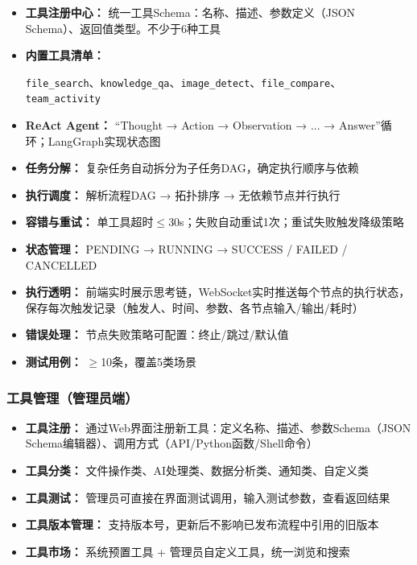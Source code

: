 \documentclass[a4paper,zihao=-4]{ctexart}
\begin{document}
\begin{itemize}
  \item \textbf{工具注册中心：} 统一工具Schema：名称、描述、参数定义（JSON Schema）、返回值类型。不少于6种工具
  \item \textbf{内置工具清单：}

        \texttt{file\_search}、\texttt{knowledge\_qa}、\texttt{image\_detect}、\texttt{file\_compare}、\texttt{team\_activity}
  \item \textbf{ReAct Agent：} “Thought → Action → Observation → ... →
        Answer”循环；LangGraph实现状态图
  \item \textbf{任务分解：} 复杂任务自动拆分为子任务DAG，确定执行顺序与依赖
  \item \textbf{执行调度：} 解析流程DAG → 拓扑排序 → 无依赖节点并行执行
  \item \textbf{容错与重试：} 单工具超时$\leq$30s；失败自动重试1次；重试失败触发降级策略
  \item \textbf{状态管理：} PENDING → RUNNING → SUCCESS / FAILED / CANCELLED
  \item \textbf{执行透明：}
        前端实时展示思考链，WebSocket实时推送每个节点的执行状态，保存每次触发记录（触发人、时间、参数、各节点输入/输出/耗时）
  \item \textbf{错误处理：} 节点失败策略可配置：终止/跳过/默认值
  \item \textbf{测试用例：} $\geq$10条，覆盖5类场景
\end{itemize}

\subsubsection{工具管理（管理员端）}

\begin{itemize}
  \item \textbf{工具注册：} 通过Web界面注册新工具：定义名称、描述、参数Schema（JSON
        Schema编辑器）、调用方式（API/Python函数/Shell命令）
  \item \textbf{工具分类：} 文件操作类、AI处理类、数据分析类、通知类、自定义类
  \item \textbf{工具测试：} 管理员可直接在界面测试调用，输入测试参数，查看返回结果
  \item \textbf{工具版本管理：} 支持版本号，更新后不影响已发布流程中引用的旧版本
  \item \textbf{工具市场：} 系统预置工具 + 管理员自定义工具，统一浏览和搜索
\end{itemize}
\end{document}
